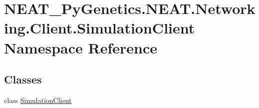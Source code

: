 \hypertarget{namespaceNEAT__PyGenetics_1_1NEAT_1_1Networking_1_1Client_1_1SimulationClient}{}\section{N\+E\+A\+T\+\_\+\+Py\+Genetics.\+N\+E\+A\+T.\+Networking.\+Client.\+Simulation\+Client Namespace Reference}
\label{namespaceNEAT__PyGenetics_1_1NEAT_1_1Networking_1_1Client_1_1SimulationClient}
\subsection*{Classes}
\begin{DoxyCompactItemize}
\item 
class \hyperlink{classNEAT__PyGenetics_1_1NEAT_1_1Networking_1_1Client_1_1SimulationClient_1_1SimulationClient}{Simulation\+Client}
\end{DoxyCompactItemize}
